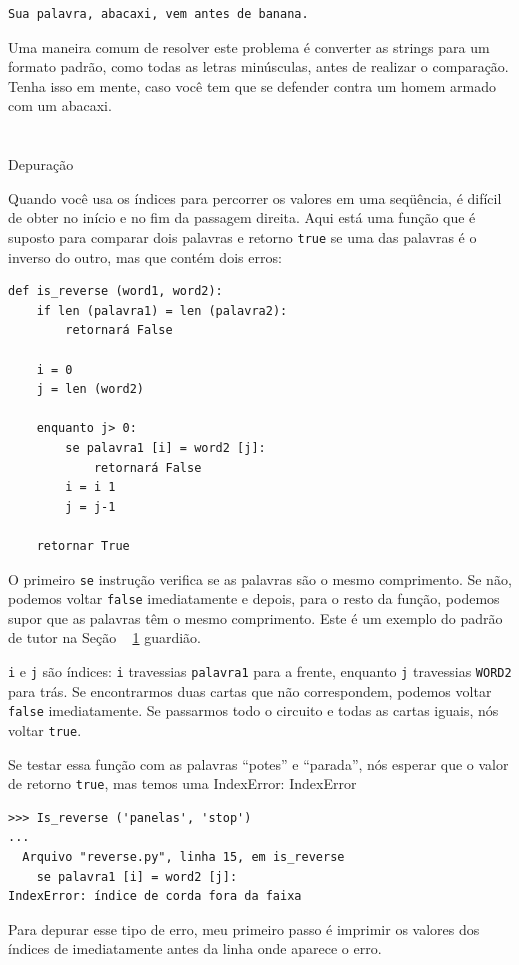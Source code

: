 \documentclass[10pt]{book}
\begin{document}
\begin{exercise}
\begin{verbatim}
Sua palavra, abacaxi, vem antes de banana.
\end{verbatim}
%
Uma maneira comum de resolver este problema é converter as strings para um
formato padrão, como todas as letras minúsculas, antes de realizar o
comparação. Tenha isso em mente, caso você tem que se defender
contra um homem armado com um abacaxi.


\section{} Depuração

Quando você usa os índices para percorrer os valores em uma seqüência,
é difícil de obter no início e no fim da passagem
direita. Aqui está uma função que é suposto para comparar dois
palavras e retorno {\tt true} se uma das palavras é o inverso
do outro, mas que contém dois erros:

\begin{verbatim}
def is_reverse (word1, word2):
    if len (palavra1) = len (palavra2):
        retornará False
    
    i = 0
    j = len (word2)

    enquanto j> 0:
        se palavra1 [i] = word2 [j]:
            retornará False
        i = i 1
        j = j-1

    retornar True
\end{verbatim}
%
O primeiro {\tt se} instrução verifica se as palavras são o
mesmo comprimento. Se não, podemos voltar {\tt false} imediatamente
e depois, para o resto da função, podemos supor que as palavras
têm o mesmo comprimento. Este é um exemplo do padrão de tutor
na Seção ~ \ref {} guardião.

{\tt i} e {\tt j} são índices: {\tt i} travessias {\tt palavra1}
para a frente, enquanto {\tt j} travessias {\tt WORD2} para trás. Se encontrarmos
duas cartas que não correspondem, podemos voltar {\tt false} imediatamente.
Se passarmos todo o circuito e todas as cartas iguais, nós
voltar {\tt true}.

Se testar essa função com as palavras ``potes'' e ``parada'', nós
esperar que o valor de retorno {\tt true}, mas temos uma IndexError:
\index{} IndexError

\begin{verbatim}
>>> Is_reverse ('panelas', 'stop')
...
  Arquivo "reverse.py", linha 15, em is_reverse
    se palavra1 [i] = word2 [j]:
IndexError: índice de corda fora da faixa
\end{verbatim}
%
Para depurar esse tipo de erro, meu primeiro passo é
imprimir os valores dos índices de imediatamente antes da linha
onde aparece o erro.


\end{exercise}
\end{document}
